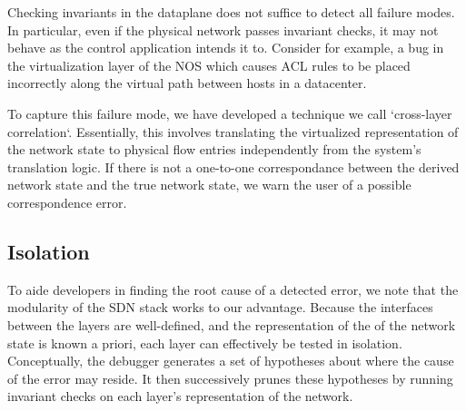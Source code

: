 Checking invariants in the dataplane does not suffice to detect all failure modes. In
particular, even if the physical network passes invariant checks, it may not behave as
the control application intends it to. Consider for example, a bug in the
virtualization layer of the NOS which causes ACL rules to be placed
incorrectly along the virtual path between hosts in a datacenter.

To capture this failure mode, we have developed a technique we call `cross-layer
correlation`. Essentially, this involves translating the
virtualized representation of the network state to physical flow entries
independently from the system's translation logic. If
there is not a one-to-one correspondance between the derived network
state and the true network state, we warn the user of a possible
correspondence error.


\subsection{Isolation}
\label{sec:isolation}

To aide developers in finding the root cause of a detected error, we note that
the modularity of the SDN stack works to our advantage. Because the interfaces
between the layers are well-defined, and the representation of the 
of the network state is known a priori, each layer can effectively be tested in
isolation. Conceptually, the debugger generates a set of hypotheses about
where the cause of the error may reside. It then successively prunes these
hypotheses by running invariant checks on each layer's representation of the
network.

